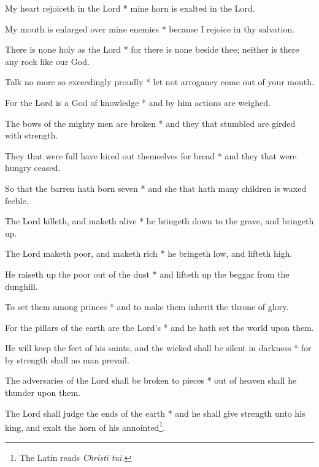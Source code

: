 My heart rejoiceth in the Lord * mine horn is exalted in the Lord.

My mouth is enlarged over mine enemies * because I rejoice in thy salvation.

There is none holy as the Lord * for there is none beside thee; neither is there any rock like our God.

Talk no more so exceedingly proudly * let not arrogancy come out of your mouth.

For the Lord is a God of knowledge * and by him actions are weighed.

The bows of the mighty men are broken * and they that stumbled are girded with strength.

They that were full have hired out themselves for bread * and they that were hungry ceased.

So that the barren hath born seven * and she that hath many children is waxed feeble.

The Lord killeth, and maketh alive * he bringeth down to the grave, and bringeth up.

The Lord maketh poor, and maketh rich * he bringeth low, and lifteth high.

He raiseth up the poor out of the dust * and lifteth up the beggar from the dunghill.

To set them among princes * and to make them inherit the throne of glory.

For the pillars of the earth are the Lord's * and he hath set the world upon them.

He will keep the feet of his saints, and the wicked shall be silent in darkness * for by strength shall no man prevail.

The adversaries of the Lord shall be broken to pieces * out of heaven shall he thunder upon them.

The Lord shall judge the ends of the earth * and he shall give strength unto his king, and exalt the horn of his annointed\footnote{The Latin reads \textit{Christi tui.}}.
